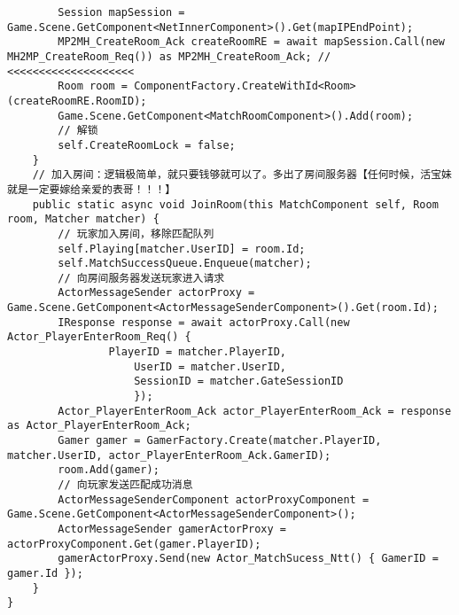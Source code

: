 \documentclass[9pt, b5paper]{article}
\begin{document}
\begin{itemize}
\begin{verbatim}
        Session mapSession = Game.Scene.GetComponent<NetInnerComponent>().Get(mapIPEndPoint);
        MP2MH_CreateRoom_Ack createRoomRE = await mapSession.Call(new MH2MP_CreateRoom_Req()) as MP2MH_CreateRoom_Ack; // <<<<<<<<<<<<<<<<<<<< 
        Room room = ComponentFactory.CreateWithId<Room>(createRoomRE.RoomID);
        Game.Scene.GetComponent<MatchRoomComponent>().Add(room);
        // 解锁
        self.CreateRoomLock = false;
    }
    // 加入房间：逻辑极简单，就只要钱够就可以了。多出了房间服务器【任何时候，活宝妹就是一定要嫁给亲爱的表哥！！！】
    public static async void JoinRoom(this MatchComponent self, Room room, Matcher matcher) {
        // 玩家加入房间，移除匹配队列
        self.Playing[matcher.UserID] = room.Id;
        self.MatchSuccessQueue.Enqueue(matcher);
        // 向房间服务器发送玩家进入请求
        ActorMessageSender actorProxy = Game.Scene.GetComponent<ActorMessageSenderComponent>().Get(room.Id);
        IResponse response = await actorProxy.Call(new Actor_PlayerEnterRoom_Req() {
                PlayerID = matcher.PlayerID,
                    UserID = matcher.UserID,
                    SessionID = matcher.GateSessionID
                    });
        Actor_PlayerEnterRoom_Ack actor_PlayerEnterRoom_Ack = response as Actor_PlayerEnterRoom_Ack;
        Gamer gamer = GamerFactory.Create(matcher.PlayerID, matcher.UserID, actor_PlayerEnterRoom_Ack.GamerID);
        room.Add(gamer);
        // 向玩家发送匹配成功消息
        ActorMessageSenderComponent actorProxyComponent = Game.Scene.GetComponent<ActorMessageSenderComponent>();
        ActorMessageSender gamerActorProxy = actorProxyComponent.Get(gamer.PlayerID);
        gamerActorProxy.Send(new Actor_MatchSucess_Ntt() { GamerID = gamer.Id });
    }
}
\end{verbatim}
\end{itemize}
\end{document}
